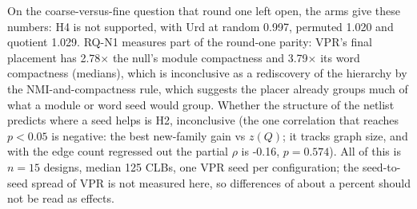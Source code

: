On the coarse-versus-fine question that round one left open, the arms give these numbers: H4 is not supported, with Urd at random 0.997, permuted
1.020 and quotient 1.029. RQ-N1 measures part of the
round-one parity: VPR's final placement has 2.78$\times$ the null's
module compactness and 3.79$\times$ its word compactness (medians), which
is inconclusive as a rediscovery of the hierarchy by the NMI-and-compactness rule, which suggests the placer already groups much of
what a module or word seed would group. Whether the structure of the
netlist predicts where a seed helps is H2, inconclusive (the one correlation that reaches $p<0.05$ is negative: the best new-family gain vs $z(Q)$; it tracks graph size, and with the edge count regressed out the partial $\rho$ is -0.16, $p=0.574$). All of this is $n=15$ designs, median 125 CLBs, one VPR
seed per configuration; the seed-to-seed spread of VPR is not measured here, so differences of about a percent should not be read as effects.